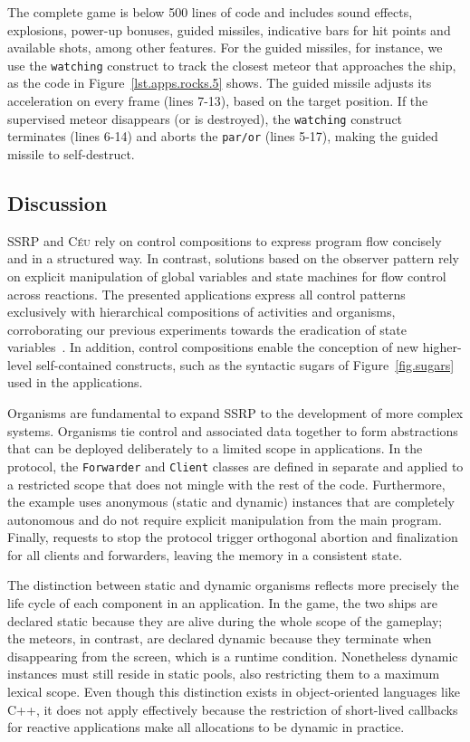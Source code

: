 \documentclass{sigplanconf}
\newcommand{\CEU}{\textsc{C\'{e}u}\xspace}
\newcommand{\code}[1] {{\small{\texttt{#1}}}}
\newcommand{\1}{\;}
\newcommand{\2}{\;\;}
\newcommand{\3}{\;\;\;}
\newcommand{\5}{\;\;\;\;\;}
\begin{document}
The complete game is below 500 lines of code and includes sound effects, 
explosions, power-up bonuses, guided missiles, indicative bars for hit points 
and available shots, among other features.
%
For the guided missiles, for instance, we use the \code{watching} construct to 
track the closest meteor that approaches the ship, as the code in 
Figure~\ref{lst.apps.rocks.5} shows.
The guided missile adjusts its acceleration on every frame (lines 7-13), based 
on the target position.
%
If the supervised meteor disappears (or is destroyed), the \code{watching} 
construct terminates (lines 6-14) and aborts the \code{par/or} (lines 5-17), 
making the guided missile to self-destruct.

\subsection{Discussion}

SSRP and \CEU rely on control compositions to express program flow concisely 
and in a structured way.
%
In contrast, solutions based on the observer pattern rely on explicit 
manipulation of global variables and state machines for flow control across 
reactions.
%
The presented applications express all control patterns exclusively with 
hierarchical compositions of activities and organisms, corroborating our 
previous experiments towards the eradication of state 
variables~\cite{ceu.sensys13}.
%
In addition, control compositions enable the conception of new higher-level 
self-contained constructs, such as the syntactic sugars of 
Figure~\ref{fig.sugars} used in the applications.

Organisms are fundamental to expand SSRP to the development of more complex 
systems.
%
Organisms tie control and associated data together to form abstractions that 
can be deployed deliberately to a limited scope in applications.
%
In the protocol, the \code{Forwarder} and \code{Client} classes are defined in 
separate and applied to a restricted scope that does not mingle with the rest 
of the code.
%
Furthermore, the example uses anonymous (static and dynamic) instances that are 
completely autonomous and do not require explicit manipulation from the main 
program.
%
Finally, requests to stop the protocol trigger orthogonal abortion and 
finalization for all clients and forwarders, leaving the memory in a consistent 
state.
%

The distinction between static and dynamic organisms reflects more precisely 
the life cycle of each component in an application.
%
In the game, the two ships are declared static because they are alive during 
the whole scope of the gameplay; the meteors, in contrast, are declared dynamic 
because they terminate when disappearing from the screen, which is a runtime 
condition.
Nonetheless dynamic instances must still reside in static pools, also 
restricting them to a maximum lexical scope.
%
Even though this distinction exists in object-oriented languages like C++, it 
does not apply effectively because the restriction of short-lived callbacks for 
reactive applications make all allocations to be dynamic in practice.
\end{document}

